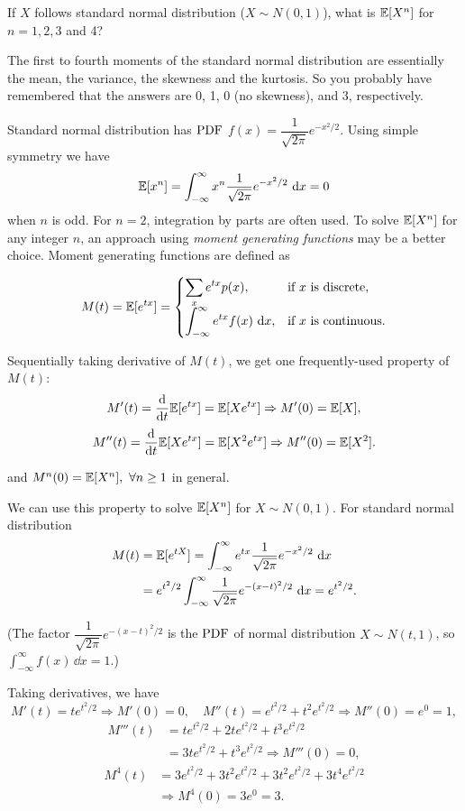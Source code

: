 \begin{problem}{If $X$ follows standard normal distribution ($X\sim N(0,1)$), what is $\mathbb{E}[X^n]$ for $n=1,2,3$ and 4?}

\end{problem}
\begin{solution}
The first to fourth moments of the standard normal distribution are essentially the mean,
the variance, the skewness and the kurtosis. So you probably have remembered that the
answers are 0, 1, 0 (no skewness), and 3, respectively.

Standard normal distribution has \(\mathrm{PDF}\) $f(x)=\dfrac{1}{\sqrt{2\pi}}e^{-x^2/2}$. Using
simple symmetry we have
\[
\mathbb{E}[x^n]=\int_{-\infty}^{\infty}x^n\frac{1}{\sqrt{2\pi}}e^{-x^2/2}\,\mathop{}\!\mathrm{d} x=0
\]
when $n$ is odd. For $n=2$, integration by parts are often used. To solve $\mathbb{E}[X^n]$ for
any integer $n$, an approach using \emph{moment generating functions} may be a better
choice. Moment generating functions are defined as

\[
M(t)=\mathbb{E}[e^{tx}]=
\begin{cases}
\displaystyle\sum_x e^{tx}p(x), & \text{if }x\text{ is discrete},\\[6pt]
\displaystyle\int_{-\infty}^{\infty}e^{tx}f(x)\,\mathop{}\!\mathrm{d} x, & \text{if }x\text{ is continuous}.
\end{cases}
\]

Sequentially taking derivative of $M(t)$, we get one frequently-used property of
$M(t)$:
\[
M'(t)=\frac{\mathop{}\!\mathrm{d}}{\mathop{}\!\mathrm{d} t}\mathbb{E}[e^{tx}]=\mathbb{E}[Xe^{tx}]\Rightarrow M'(0)=\mathbb{E}[X],
\]
\[
M''(t)=\frac{\mathop{}\!\mathrm{d}}{\mathop{}\!\mathrm{d} t}\mathbb{E}[Xe^{tx}]=\mathbb{E}[X^2e^{tx}]\Rightarrow M''(0)=\mathbb{E}[X^2].
\]


and $M^n(0)=\mathbb{E}[X^n],\ \forall n\ge 1$ in general.

We can use this property to solve $\mathbb{E}[X^n]$ for $X\sim N(0,1)$. For standard normal
distribution
\[
\begin{aligned}
M(t)&=\mathbb{E}[e^{tX}]=\int_{-\infty}^{\infty}e^{tx}\frac{1}{\sqrt{2\pi}}e^{-x^2/2}\,\mathop{}\!\mathrm{d} x\\
&=e^{t^2/2}\int_{-\infty}^{\infty}\frac{1}{\sqrt{2\pi}}e^{-(x-t)^2/2}\,\mathop{}\!\mathrm{d} x=e^{t^2/2}.
\end{aligned}
\]

(The factor $\dfrac{1}{\sqrt{2\pi}}e^{-(x-t)^2/2}$ is the \(\mathrm{PDF}\) of normal distribution
$X\sim N(t,1)$, so $\int_{-\infty}^{\infty}f(x)\,\dd x=1$.)

Taking derivatives, we have
\[
M'(t)=te^{t^2/2}\Rightarrow M'(0)=0,\quad
M''(t)=e^{t^2/2}+t^2e^{t^2/2}\Rightarrow M''(0)=e^0=1,
\]
\[
\begin{aligned}
M'''(t)&=te^{t^2/2}+2te^{t^2/2}+t^3e^{t^2/2}\\
&=3te^{t^2/2}+t^3e^{t^2/2}\Rightarrow M'''(0)=0,
\end{aligned}
\]
\[
\begin{aligned}
M^{4}(t)&=3e^{t^2/2}+3t^2e^{t^2/2}+3t^2e^{t^2/2}+3t^4e^{t^2/2}\\
&\Rightarrow M^{4}(0)=3e^0=3.
\end{aligned}
\]
\end{solution}

